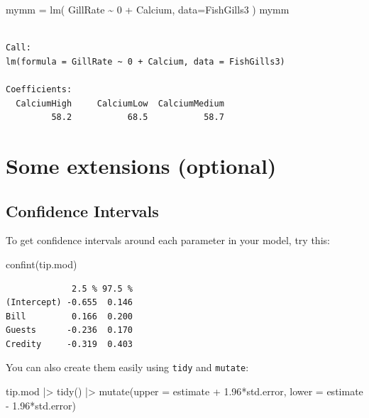 \documentclass[
  letterpaper,
  DIV=11,
  numbers=noendperiod]{scrreprt}
\newenvironment{Shaded}{}{}
\newcommand{\AttributeTok}[1]{\textcolor[rgb]{0.49,0.56,0.16}{#1}}
\newcommand{\DecValTok}[1]{\textcolor[rgb]{0.25,0.63,0.44}{#1}}
\newcommand{\FloatTok}[1]{\textcolor[rgb]{0.25,0.63,0.44}{#1}}
\newcommand{\FunctionTok}[1]{\textcolor[rgb]{0.02,0.16,0.49}{#1}}
\newcommand{\NormalTok}[1]{#1}
\newcommand{\OtherTok}[1]{\textcolor[rgb]{0.00,0.44,0.13}{#1}}
\newcommand{\SpecialCharTok}[1]{\textcolor[rgb]{0.25,0.44,0.63}{#1}}
\begin{document}
\begin{Shaded}
\begin{Highlighting}[]
\NormalTok{mymm }\OtherTok{=} \FunctionTok{lm}\NormalTok{( GillRate }\SpecialCharTok{\textasciitilde{}} \DecValTok{0} \SpecialCharTok{+}\NormalTok{ Calcium, }\AttributeTok{data=}\NormalTok{FishGills3 )}
\NormalTok{mymm}
\end{Highlighting}
\end{Shaded}

\begin{verbatim}

Call:
lm(formula = GillRate ~ 0 + Calcium, data = FishGills3)

Coefficients:
  CalciumHigh     CalciumLow  CalciumMedium  
         58.2           68.5           58.7  
\end{verbatim}

\section{Some extensions (optional)}\label{some-extensions-optional}

\subsection{Confidence Intervals}\label{confidence-intervals}

To get confidence intervals around each parameter in your model, try
this:

\begin{Shaded}
\begin{Highlighting}[]
\FunctionTok{confint}\NormalTok{(tip.mod)}
\end{Highlighting}
\end{Shaded}

\begin{verbatim}
             2.5 % 97.5 %
(Intercept) -0.655  0.146
Bill         0.166  0.200
Guests      -0.236  0.170
Credity     -0.319  0.403
\end{verbatim}

You can also create them easily using \texttt{tidy} and \texttt{mutate}:

\begin{Shaded}
\begin{Highlighting}[]
\NormalTok{tip.mod }\SpecialCharTok{|\textgreater{}} 
  \FunctionTok{tidy}\NormalTok{() }\SpecialCharTok{|\textgreater{}} 
  \FunctionTok{mutate}\NormalTok{(}\AttributeTok{upper =}\NormalTok{ estimate }\SpecialCharTok{+} \FloatTok{1.96}\SpecialCharTok{*}\NormalTok{std.error,}
         \AttributeTok{lower =}\NormalTok{ estimate }\SpecialCharTok{{-}} \FloatTok{1.96}\SpecialCharTok{*}\NormalTok{std.error)}
\end{Highlighting}
\end{Shaded}
\end{document}
